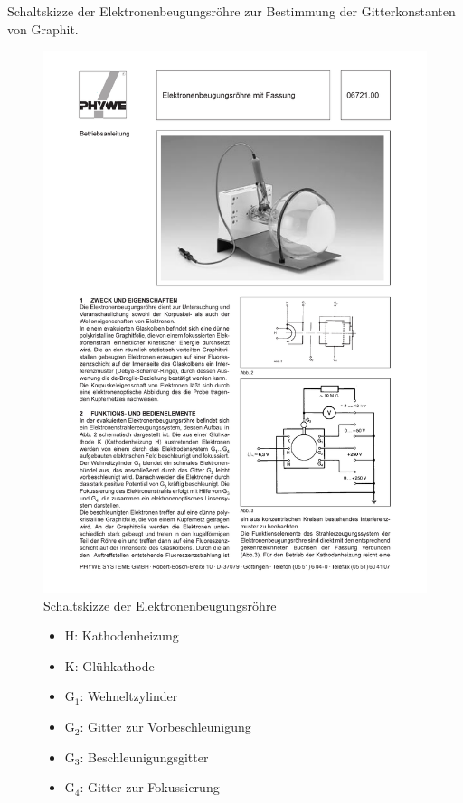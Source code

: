 \documentclass[12pt,a4paper]{article}
\begin{document}
Schaltskizze der Elektronenbeugungsröhre zur Bestimmung der Gitterkonstanten von Graphit.

\begin{figure}[H] 
  \centering
    \includegraphics[trim = 105mm 47mm 10mm 178mm, clip, scale = 1]{beugungsroehre.pdf}
  	\caption[Schaltskizze der Elektronenbeugungsröhre]{Schaltskizze der Elektronenbeugungsröhre\footnotemark}
  \label{fig:aufbau_h}
\end{figure}

\begin{figure}[H]
\begin{itemize}
\item	H:		Kathodenheizung 

\item	K:		Glühkathode

\item	G$_1$:	Wehneltzylinder 

\item	G$_2$:	Gitter zur Vorbeschleunigung

\item	G$_3$:	Beschleunigungsgitter

\item	G$_4$:	Gitter zur Fokussierung
\end{itemize}
\end{figure}
\end{document}
